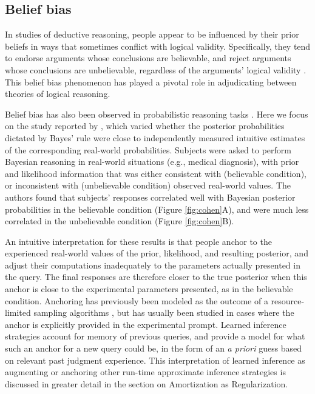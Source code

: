 \subsection{Belief bias}

In studies of deductive reasoning, people appear to be influenced by their prior beliefs in ways that sometimes conflict with logical validity. Specifically, they tend to endorse arguments whose conclusions are believable, and reject arguments whose conclusions are unbelievable, regardless of the arguments' logical validity \citep[e.g.,][]{evans1983conflict,newstead1992source,oakhill1989believability,janis1943relationship}. This belief bias phenomenon has played a pivotal role in adjudicating between theories of logical reasoning.

Belief bias has also been observed in probabilistic reasoning tasks \citep{evans2002background,cohen2017beliefs}. Here we focus on the study reported by \citet{cohen2017beliefs}, which varied whether the posterior probabilities dictated by Bayes' rule were close to independently measured intuitive estimates of the corresponding real-world probabilities. Subjects were asked to perform Bayesian reasoning in real-world situations (e.g., medical diagnosis), with prior and likelihood information that was either consistent with (believable condition), or inconsistent with (unbelievable condition) observed real-world values. The authors found that subjects' responses correlated well with Bayesian posterior probabilities in the believable condition (Figure \ref{fig:cohen}A), and were much less correlated in the unbelievable condition (Figure \ref{fig:cohen}B).

An intuitive interpretation for these results is that people anchor to the experienced real-world values of the prior, likelihood, and resulting posterior, and adjust their computations inadequately to the parameters actually presented in the query. The final responses are therefore closer to the true posterior when this anchor is close to the experimental parameters presented, as in the believable condition. Anchoring has previously been modeled as the outcome of a resource-limited sampling algorithms \citep{dasgupta2017hypotheses, lieder2017anchoring}, but has usually been studied in cases where the anchor is explicitly provided in the experimental prompt. Learned inference strategies account for memory of previous queries, and provide a model for what such an anchor for a new query could be, in the form of an \emph{a priori} guess based on relevant past judgment experience. This interpretation of learned inference as augmenting or anchoring other run-time approximate inference strategies is discussed in greater detail in the section on Amortization as Regularization.

